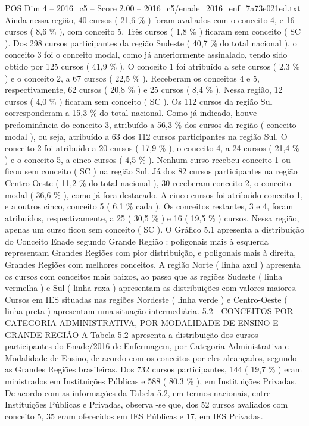 \begin{textsample}{POS Dim 4 – 2016\_c5 – Score 2.00 – 2016\_c5/enade\_2016\_enf\_7a73e021ed.txt}
Ainda nessa região, 40 cursos ( 21,6 \% ) foram avaliados com o conceito 4, e 16 cursos ( 8,6 \% ), com conceito 5.
Três cursos ( 1,8 \% ) ficaram sem conceito ( SC ).
Dos 298 cursos participantes da região Sudeste ( 40,7 \% do total nacional ), o conceito 3 foi o conceito modal, como já anteriormente assinalado, tendo sido obtido por 125 cursos ( 41,9 \% ).
O conceito 1 foi atribuído a sete cursos ( 2,3 \% ) e o conceito 2, a 67 cursos ( 22,5 \% ).
Receberam os conceitos 4 e 5, respectivamente, 62 cursos ( 20,8 \% ) e 25 cursos ( 8,4 \% ).
Nessa região, 12 cursos ( 4,0 \% ) ficaram sem conceito ( SC ).
Os 112 cursos da região Sul corresponderam a 15,3 \% do total nacional.
Como já indicado, houve predominância do conceito 3, atribuído a 56,3 \% dos cursos da região ( conceito modal ), ou seja, atribuído a 63 dos 112 cursos participantes na região Sul.
O conceito 2 foi atribuído a 20 cursos ( 17,9 \% ), o conceito 4, a 24 cursos ( 21,4 \% ) e o conceito 5, a cinco cursos ( 4,5 \% ).
Nenhum curso recebeu conceito 1 ou ficou sem conceito ( SC ) na região Sul.
Já dos 82 cursos participantes na região Centro-Oeste ( 11,2 \% do total nacional ), 30 receberam conceito 2, o conceito modal ( 36,6 \% ), como já fora destacado.
A cinco cursos foi atribuído conceito 1, e a outros cinco, conceito 5 ( 6,1 \% cada ).
Os conceitos restantes, 3 e 4, foram atribuídos, respectivamente, a 25 ( 30,5 \% ) e 16 ( 19,5 \% ) cursos.
Nessa região, apenas um curso ficou sem conceito ( SC ).
O Gráfico 5.1 apresenta a distribuição do Conceito Enade segundo Grande Região : poligonais mais à esquerda representam Grandes Regiões com pior distribuição, e poligonais mais à direita, Grandes Regiões com melhores conceitos.
A região Norte ( linha azul ) apresenta os cursos com conceitos mais baixos, ao passo que as regiões Sudeste ( linha vermelha ) e Sul ( linha roxa ) apresentam as distribuições com valores maiores.
Cursos em IES situadas nas regiões Nordeste ( linha verde ) e Centro-Oeste ( linha preta ) apresentam uma situação intermediária. 5.2 - CONCEITOS POR CATEGORIA ADMINISTRATIVA, POR MODALIDADE DE ENSINO E GRANDE REGIÃO A Tabela 5.2 apresenta a distribuição dos cursos participantes do Enade/2016 de Enfermagem, por Categoria Administrativa e Modalidade de Ensino, de acordo com os conceitos por eles alcançados, segundo as Grandes Regiões brasileiras.
Dos 732 cursos participantes, 144 ( 19,7 \% ) eram ministrados em Instituições Públicas e 588 ( 80,3 \% ), em Instituições Privadas.
De acordo com as informações da Tabela 5.2, em termos nacionais, entre Instituições Públicas e Privadas, observa -se que, dos 52 cursos avaliados com conceito 5, 35 eram oferecidos em IES Públicas e 17, em IES Privadas.

\end{textsample}
